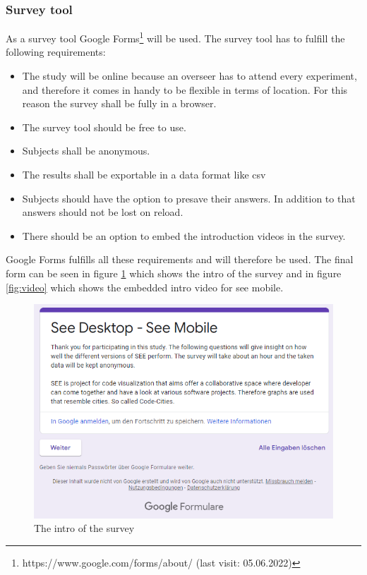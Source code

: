 \subsubsection{Survey tool}
\label{survey}
As a survey tool Google Forms\footnote{https://www.google.com/forms/about/ (last visit: 05.06.2022)} will be used.
The survey tool has to fulfill the following requirements: 
\begin{itemize}
  \item The study will be online because an overseer has to attend every experiment, and therefore it comes in handy to be flexible in terms of location. For this reason the survey shall be fully in a browser. 
  \item The survey tool should be free to use.
  \item Subjects shall be anonymous.
  \item The results shall be exportable in a data format like \gls{csv}
  \item Subjects should have the option to presave their answers. In addition to that answers should not be lost on reload.
  \item There should be an option to embed the introduction videos in the survey.
\end{itemize}

Google Forms fulfills all these requirements and will therefore be used. 
The final form can be seen in figure \ref{fig:intro} which shows the intro of the survey and in figure \ref{fig:video} which shows the embedded intro video for \gls{see} mobile.
\begin{figure}[H]
  \centering
  \includegraphics[width=1\textwidth]{Evaluation/img/form_intro.png}
  \caption{The intro of the survey}\label{fig:intro}
\end{figure}

